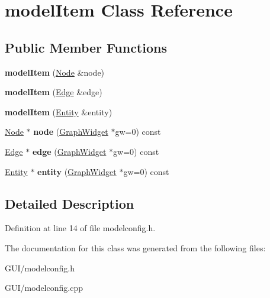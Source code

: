 \hypertarget{classmodel_item}{}\section{model\+Item Class Reference}
\label{classmodel_item}
\subsection*{Public Member Functions}
\begin{DoxyCompactItemize}
\item 
\mbox{\label{classmodel_item_af3813ac8430c54475942b37b4a31626c}} 
{\bfseries model\+Item} (\hyperlink{class_node}{Node} \&node)
\item 
\mbox{\label{classmodel_item_aed1c6e97b074e61d87107a34790c1c7d}} 
{\bfseries model\+Item} (\hyperlink{class_edge}{Edge} \&edge)
\item 
\mbox{\label{classmodel_item_a2576f7d8f6557ba4e287e5f4b9b4d33c}} 
{\bfseries model\+Item} (\hyperlink{class_entity}{Entity} \&entity)
\item 
\mbox{\label{classmodel_item_a3a8bd079eb1822c36d1b84fe9d68a8e1}} 
\hyperlink{class_node}{Node} $\ast$ {\bfseries node} (\hyperlink{class_graph_widget}{Graph\+Widget} $\ast$gw=0) const
\item 
\mbox{\label{classmodel_item_ad0263bdac86c790351940beb6778e2e5}} 
\hyperlink{class_edge}{Edge} $\ast$ {\bfseries edge} (\hyperlink{class_graph_widget}{Graph\+Widget} $\ast$gw=0) const
\item 
\mbox{\label{classmodel_item_a0e51c73475bd74773e37a25384e7147f}} 
\hyperlink{class_entity}{Entity} $\ast$ {\bfseries entity} (\hyperlink{class_graph_widget}{Graph\+Widget} $\ast$gw=0) const
\end{DoxyCompactItemize}


\subsection{Detailed Description}


Definition at line 14 of file modelconfig.\+h.



The documentation for this class was generated from the following files\+:\begin{DoxyCompactItemize}
\item 
G\+U\+I/modelconfig.\+h\item 
G\+U\+I/modelconfig.\+cpp\end{DoxyCompactItemize}
